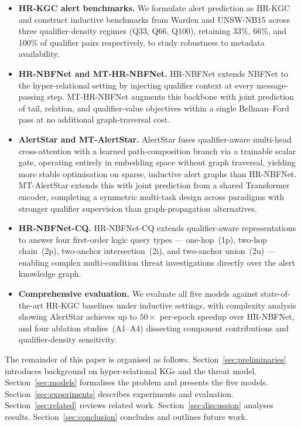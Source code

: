 \documentclass[10pt,journal,compsoc]{IEEEtran}
\begin{document}
\begin{itemize}
  \item \textbf{HR-KGC alert benchmarks.}
    We formulate alert prediction as HR-KGC and
    construct inductive benchmarks from Warden and
    UNSW-NB15 across three qualifier-density regimes
    (Q33, Q66, Q100), retaining 33\%, 66\%,
and 100\% of qualifier pairs respectively, to study robustness to metadata
    availability.

  \item \textbf{HR-NBFNet and MT-HR-NBFNet.}
    HR-NBFNet extends NBFNet to the hyper-relational
    setting by injecting qualifier context at every
    message-passing step. MT-HR-NBFNet augments this
    backbone with joint prediction of tail, relation,
    and qualifier-value objectives within a single
    Bellman--Ford pass at no additional graph-traversal
    cost.

  \item \textbf{AlertStar and MT-AlertStar.}
    AlertStar fuses qualifier-aware multi-head
    cross-attention with a learned path-composition
    branch via a trainable scalar gate, operating
    entirely in embedding space without graph traversal,
    yielding more stable optimisation on sparse,
    inductive alert graphs than HR-NBFNet.
    MT-AlertStar extends this with joint prediction
    from a shared Transformer encoder, completing a
    symmetric multi-task design across  paradigms
    with stronger qualifier supervision than
    graph-propagation alternatives.

  \item \textbf{HR-NBFNet-CQ.}
    HR-NBFNet-CQ extends qualifier-aware representations
    to answer four first-order logic query types ---
    one-hop~(1p), two-hop chain~(2p), two-anchor
    intersection~(2i), and two-anchor union~(2u) --- enabling
    complex multi-condition threat investigations
    directly over the alert knowledge graph.

  \item \textbf{Comprehensive evaluation.}
    We evaluate all five models against state-of-the-art
    HR-KGC baselines under inductive settings, with
    complexity analysis showing AlertStar achieves up
    to $50\times$ per-epoch speedup over HR-NBFNet,
    and four ablation studies~(A1--A4) dissecting
    component contributions and qualifier-density
    sensitivity.
\end{itemize}

The remainder of this paper is organised as follows.
Section~\ref{sec:preliminaries} introduces background
on hyper-relational KGs and the threat model.
Section~\ref{sec:models} formalises the problem and
presents the five models.
Section~\ref{sec:experiments} describes experiments
and evaluation.
Section~\ref{sec:related} reviews related work.
Section~\ref{sec:discussion} analyses results.
Section~\ref{sec:conclusion} concludes and outlines
future work.
\end{document}
